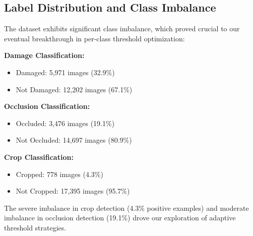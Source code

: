 \documentclass[12pt]{article}
\begin{document}
\subsection{Label Distribution and Class Imbalance}

The dataset exhibits significant class imbalance, which proved crucial to our eventual breakthrough in per-class threshold optimization:

\textbf{Damage Classification:}
\begin{itemize}[itemsep=1pt,parsep=0pt,topsep=2pt]
\item Damaged: 5,971 images (32.9\%)
\item Not Damaged: 12,202 images (67.1\%)
\end{itemize}

\textbf{Occlusion Classification:}
\begin{itemize}[itemsep=1pt,parsep=0pt,topsep=2pt]
\item Occluded: 3,476 images (19.1\%)
\item Not Occluded: 14,697 images (80.9\%)
\end{itemize}

\textbf{Crop Classification:}
\begin{itemize}[itemsep=1pt,parsep=0pt,topsep=2pt]
\item Cropped: 778 images (4.3\%)
\item Not Cropped: 17,395 images (95.7\%)
\end{itemize}

The severe imbalance in crop detection (4.3\% positive examples) and moderate imbalance in occlusion detection (19.1\%) drove our exploration of adaptive threshold strategies.
\end{document}
